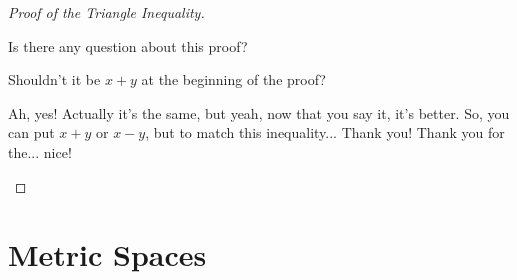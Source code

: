 \begin{proof}[Proof of the Triangle Inequality]
\begin{spoken-clean}[01:08:19 - 01:08:53]
Is there any question about this proof?
\end{spoken-clean}

\begin{student-interaction}
Shouldn't it be $x + y$ at the beginning of the proof?
\end{student-interaction}

\begin{spoken-clean}[01:08:54 - 01:09:24]
Ah, yes! Actually it's the same, but yeah, now that you say it, it's better. So, you can put $x+y$ or $x-y$, but to match this inequality... Thank you! Thank you for the... nice!
\end{spoken-clean}
\end{proof}

\begin{ai-global-state-checkpoint-invisible-content}
\end{ai-global-state-checkpoint-invisible-content}

\section{Metric Spaces}

